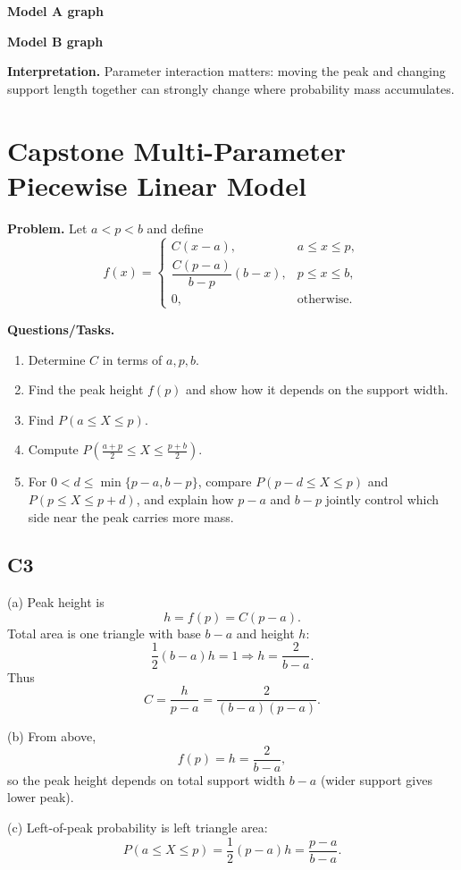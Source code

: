 \textbf{Model A graph}

\textbf{Model B graph}

\textbf{Interpretation.}
Parameter interaction matters: moving the peak and changing support length together can strongly change where probability mass accumulates.

\section{Capstone Multi-Parameter Piecewise Linear Model}

\textbf{Problem.}
Let $a<p<b$ and define
\[
f(x)=\begin{cases}
C(x-a), & a\le x\le p,\\
\dfrac{C(p-a)}{b-p}(b-x), & p\le x\le b,\\
0, & \text{otherwise.}
\end{cases}
\]

\textbf{Questions/Tasks.}
\begin{enumerate}[label=(\alph*)]
\item Determine $C$ in terms of $a,p,b$.
\item Find the peak height $f(p)$ and show how it depends on the support width.
\item Find $P(a\le X\le p)$.
\item Compute $P\!\left(\frac{a+p}{2}\le X\le\frac{p+b}{2}\right)$.
\item For $0<d\le\min\{p-a,b-p\}$, compare $P(p-d\le X\le p)$ and $P(p\le X\le p+d)$, and explain how $p-a$ and $b-p$ jointly control which side near the peak carries more mass.
\end{enumerate}

\subsection*{C3}
(a) Peak height is
\[
h=f(p)=C(p-a).
\]
Total area is one triangle with base $b-a$ and height $h$:
\[
\frac12(b-a)h=1
\Rightarrow
h=\frac{2}{b-a}.
\]
Thus
\[
C=\frac{h}{p-a}=\frac{2}{(b-a)(p-a)}.
\]

(b) From above,
\[
f(p)=h=\frac{2}{b-a},
\]
so the peak height depends on total support width $b-a$ (wider support gives lower peak).

(c) Left-of-peak probability is left triangle area:
\[
P(a\le X\le p)=\frac12(p-a)h=\frac{p-a}{b-a}.
\]

